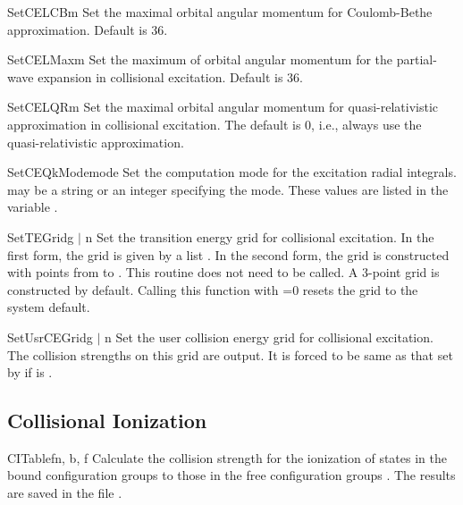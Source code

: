 \begin{fundesc}{SetCELCB}{m}
Set the maximal orbital angular momentum for Coulomb-Bethe approximation.
Default is 36.
\end{fundesc}

\begin{fundesc}{SetCELMax}{m}
Set the maximum of orbital angular momentum for the partial-wave expansion in
collisional excitation. Default is 36.
\end{fundesc}

\begin{fundesc}{SetCELQR}{m}
Set the maximal orbital angular momentum for quasi-relativistic approximation
in collisional excitation. The default is 0, i.e., always use the
quasi-relativistic approximation.
\end{fundesc}

\begin{fundesc}{SetCEQkMode}{mode}
Set the computation mode for the excitation radial integrals.  may
be a string or an integer specifying the mode. These values are listed in the
variable .
\end{fundesc}

\begin{fundesc}{SetTEGrid}{g $\mid$ n}
Set the transition energy grid for collisional excitation. In the first form,
the grid is given by a list . In the second form, the grid is constructed
with  points from   to . This routine does not need to be
called. A 3-point grid is constructed by default. Calling this function with
=0 resets the grid to the system default.
\end{fundesc}

\begin{fundesc}{SetUsrCEGrid}{g $\mid$ n}
Set the user collision energy grid for collisional excitation. The collision
strengths on this grid are output. It is forced to be same as that set by
 if  is .
\end{fundesc}



\subsection{Collisional Ionization}

\begin{fundesc}{CITable}{fn, b, f}
Calculate the collision strength for the ionization of states in the bound
configuration groups  to those in the free configuration groups
. The results are saved in the file .
\end{fundesc}

